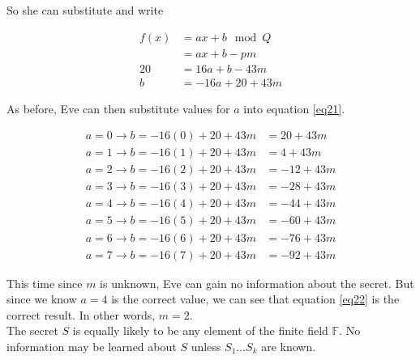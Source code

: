 \documentclass[preview,border=3mm]{article}
\begin{document}
\noindent
So she can substitute and write

\begin{align}
    f(x) &= ax + b \mod Q \nonumber \\
         &= ax + b - pm \nonumber \\
      20 &= 16a + b - 43m \nonumber \\
      b  &= -16a + 20 + 43m \label{eq21}
\end{align}

\noindent
As before, Eve can then substitute values for $a$ into equation \ref{eq21}.

\begin{align}
    a = 0 \rightarrow b = -16(0) + 20 + 43m &= 20 + 43m \nonumber \\
    a = 1 \rightarrow b = -16(1) + 20 + 43m &= 4 + 43m \nonumber \\
    a = 2 \rightarrow b = -16(2) + 20 + 43m &= -12 + 43m \nonumber \\
    a = 3 \rightarrow b = -16(3) + 20 + 43m &= -28 + 43m \nonumber \\
    a = 4 \rightarrow b = -16(4) + 20 + 43m &= -44 + 43m \label{eq22} \\
    a = 5 \rightarrow b = -16(5) + 20 + 43m &= -60 + 43m \nonumber \\
    a = 6 \rightarrow b = -16(6) + 20 + 43m &= -76 + 43m \nonumber \\
    a = 7 \rightarrow b = -16(7) + 20 + 43m &= -92 + 43m \nonumber
\end{align}

\noindent
This time since $m$ is unknown, Eve can gain no information about the secret.
But since we know $a = 4$ is the correct value, we can see that equation
\ref{eq22} is the correct result. In other words, $m = 2$. \\

\noindent
The secret $S$ is equally likely to be any element of the finite field
$\mathbb{F}$. No information may be learned about $S$ unless $S_1 \ldots S_k$
are known.
\end{document}
